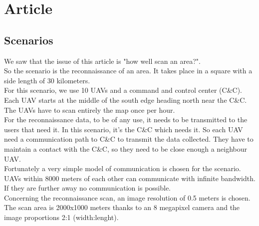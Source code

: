 \part{Article}

\setcounter{chapter}{0}

\chapter{Scenarios}

We saw that the issue of this article is "how well scan an area?".\\
So the scenario is the reconnaissance of an area. It takes place in a square with a side length of 30 kilometers.\\
For this scenario, we use 10 UAVs and a command and control center (C\&C). Each UAV starts at the middle of the south edge heading north near the C\&C.
The UAVs have to scan entirely the map once per hour.\\

For the reconnaissance data, to be of any use, it needs to be transmitted to the users that need it. In this scenario, it's the C\&C which needs it. So each UAV need a communication path to C\&C to transmit the data collected. They have to maintain a contact with the C\&C, so they need to be close enough a neighbour UAV.\\
Fortunately a very simple model of communication is chosen for the scenario.  UAVs  within 8000  meters  of  each  other  can  communicate  with infinite  bandwidth.  If  they  are  further  away  no communication  is  possible.\\

Concerning the reconnaissance scan, an image resolution of 0.5 meters is chosen. The scan area is 2000x1000 meters thanks to an 8 megapixel camera and the image proportions 2:1 (width:lenght).